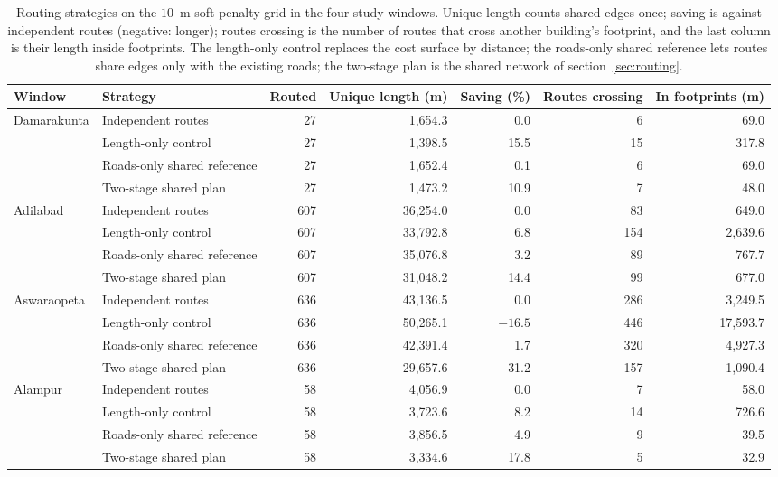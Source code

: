 \documentclass[10pt,a4paper,twocolumn]{article}
\begin{document}
\begin{table}[tbp]
\caption{Routing strategies on the $10$~m soft-penalty grid in the four study windows. Unique length counts shared edges once; saving is against independent routes (negative: longer); routes crossing is the number of routes that cross another building's footprint, and the last column is their length inside footprints. The length-only control replaces the cost surface by distance; the roads-only shared reference lets routes share edges only with the existing roads; the two-stage plan is the shared network of section~\ref{sec:routing}.}
\label{tab:strategies}
\centering
\scriptsize
\begin{tabular}{@{}llrrrrr@{}}
\toprule
Window & Strategy & Routed & Unique length (m) & Saving (\%) & Routes crossing & In footprints (m)\\
\midrule
Damarakunta & Independent routes & 27 & 1{,}654.3 & 0.0 & 6 & 69.0\\
& Length-only control & 27 & 1{,}398.5 & 15.5 & 15 & 317.8\\
& Roads-only shared reference & 27 & 1{,}652.4 & 0.1 & 6 & 69.0\\
& Two-stage shared plan & 27 & 1{,}473.2 & 10.9 & 7 & 48.0\\
\midrule
Adilabad & Independent routes & 607 & 36{,}254.0 & 0.0 & 83 & 649.0\\
& Length-only control & 607 & 33{,}792.8 & 6.8 & 154 & 2{,}639.6\\
& Roads-only shared reference & 607 & 35{,}076.8 & 3.2 & 89 & 767.7\\
& Two-stage shared plan & 607 & 31{,}048.2 & 14.4 & 99 & 677.0\\
\midrule
Aswaraopeta & Independent routes & 636 & 43{,}136.5 & 0.0 & 286 & 3{,}249.5\\
& Length-only control & 636 & 50{,}265.1 & $-16.5$ & 446 & 17{,}593.7\\
& Roads-only shared reference & 636 & 42{,}391.4 & 1.7 & 320 & 4{,}927.3\\
& Two-stage shared plan & 636 & 29{,}657.6 & 31.2 & 157 & 1{,}090.4\\
\midrule
Alampur & Independent routes & 58 & 4{,}056.9 & 0.0 & 7 & 58.0\\
& Length-only control & 58 & 3{,}723.6 & 8.2 & 14 & 726.6\\
& Roads-only shared reference & 58 & 3{,}856.5 & 4.9 & 9 & 39.5\\
& Two-stage shared plan & 58 & 3{,}334.6 & 17.8 & 5 & 32.9\\
\bottomrule
\end{tabular}
\end{table}
\end{document}
